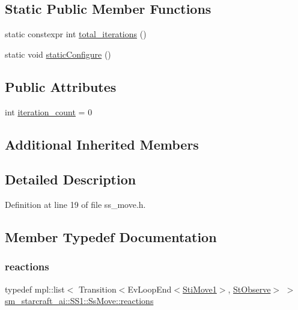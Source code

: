 \subsection*{Static Public Member Functions}
\begin{DoxyCompactItemize}
\item 
static constexpr int \hyperlink{structsm__starcraft__ai_1_1SS1_1_1SsMove_a3b53c868a59845bc82e7007e42eb9b88}{total\+\_\+iterations} ()
\item 
static void \hyperlink{structsm__starcraft__ai_1_1SS1_1_1SsMove_ad8d474df3138ce9bd416b0a4bba5081a}{static\+Configure} ()
\end{DoxyCompactItemize}
\subsection*{Public Attributes}
\begin{DoxyCompactItemize}
\item 
int \hyperlink{structsm__starcraft__ai_1_1SS1_1_1SsMove_aece9d76354fedaeb2a3e4af929ee1175}{iteration\+\_\+count} = 0
\end{DoxyCompactItemize}
\subsection*{Additional Inherited Members}


\subsection{Detailed Description}


Definition at line 19 of file ss\+\_\+move.\+h.



\subsection{Member Typedef Documentation}
\mbox{\label{structsm__starcraft__ai_1_1SS1_1_1SsMove_a90e75f26213c0f79449f41de81d74836}} 
\subsubsection{\texorpdfstring{reactions}{reactions}}
{\footnotesize\ttfamily typedef mpl\+::list$<$ Transition$<$Ev\+Loop\+End$<$\hyperlink{structsm__starcraft__ai_1_1move__inner__states_1_1StiMove1}{Sti\+Move1}$>$, \hyperlink{structsm__starcraft__ai_1_1StObserve}{St\+Observe}$>$ $>$ \hyperlink{structsm__starcraft__ai_1_1SS1_1_1SsMove_a90e75f26213c0f79449f41de81d74836}{sm\+\_\+starcraft\+\_\+ai\+::\+S\+S1\+::\+Ss\+Move\+::reactions}}



